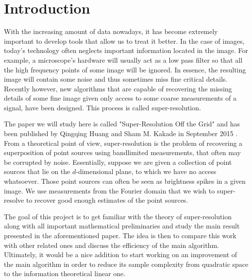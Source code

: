 \chapter{Introduction}
With the increasing amount of data nowadays, it has become extremely important to develop tools that allow us to treat it better. In the case of images, today's technology often neglects important information located in the image. For example, a microscope's hardware will usually act as a low pass filter so that all the high frequency points of some image will be ignored. In essence, the resulting image will contain some noise and thus sometimes miss fine critical details. Recently however, new algorithms that are capable of recovering the missing details of some fine image given only access to some coarse measurements of a signal, have been designed. This process is called super-resolution.\par 

The paper we will study here is called "Super-Resolution Off the Grid" and has been published by Qingqing Huang and Sham M. Kakade in September 2015 \cite{mainPaper}. From a theoretical point of view, super-resolution is the problem of recovering a superposition of point sources using bandlimited measurements, that often may be corrupted by noise. Essentially, suppose we are given a collection of point sources that lie on the $d$-dimensional plane, to which we have no access whatsoever. Those point sources can often be seen as brightness spikes in a given image. We use measurements from the Fourier domain that we wish to super-resolve to recover good enough estimates of the point sources.\par 

The goal of this project is to get familiar with the theory of super-resolution along with all important mathematical preliminaries and study the main result presented in the aforementioned paper. The idea is then to compare this work with other related ones and discuss the efficiency of the main algorithm. Ultimately, it would be a nice addition to start working on an improvement of the main algorithm in order to reduce its sample complexity from quadratic space to the information theoretical linear one.